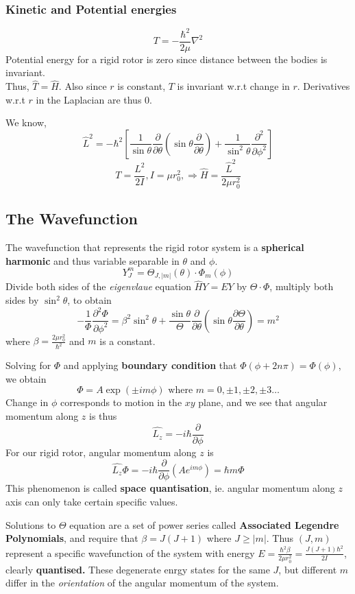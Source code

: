 \documentclass[12pt]{article}
\begin{document}
\subsubsection*{Kinetic and Potential energies}
\[T = -\frac{\hbar^2}{2\mu}\nabla^2\]
Potential energy for a rigid rotor is zero since distance between the bodies is invariant. \\ 
Thus, $\hat{T}=\hat{H}$. Also since $r$ is constant, $T$ is invariant w.r.t change in $r$. Derivatives w.r.t $r$ in the Laplacian are thus $0$.

We know, \[\hat{L}^2=-\hbar^2 \left[ \frac{1}{ \sin\theta} \frac{\partial}{\partial \theta } \left(\sin \theta \frac{\partial}{\partial \theta }\right) +  \frac{1}{\sin^2{\theta}} \frac{\partial^2}{\partial \phi^2 } \right]\]
\[T=\frac{L^2}{2I}, I=\mu r_0^2, \Rightarrow \boxed{\hat{H}= \frac{\hat{L}^2}{2\mu r_0^2 }}\]
\subsection*{The Wavefunction}
The wavefunction that represents the rigid rotor system is a \textbf{spherical harmonic} and thus variable separable in $\theta$ and $\phi$. 
\[Y_J^m=\Theta_{J, |m|}(\theta) \cdot \Phi_m(\phi)\]
Divide both sides of the \emph{eigenvlaue} equation $\hat{H}Y=EY$ by $\Theta \cdot \Phi$, multiply both sides by $\sin^2{\theta}$, to obtain 
\[-\frac{1}{\Phi}\frac{\partial^2 \Phi}{\partial \phi^2} = \beta^2 \sin^2\theta + \frac{\sin \theta}{\Theta} \frac{\partial}{\partial \theta} \left( \sin\theta \frac{\partial \Theta }{\partial \theta}\right) = m^2\]
where $\beta = \displaystyle \frac{2\mu r_0^2}{\hbar^2}$ and $m $ is a constant.

Solving for $\Phi$ and applying \textbf{boundary condition} that $\Phi(\phi + 2n\pi) = \Phi(\phi)$, we obtain
\[\Phi=A \exp{(\pm i m \phi)} \text{ where } m=0, \pm 1, \pm 2, \pm 3 \ldots\]
Change in $\phi$ corresponds to motion in the $xy$ plane, and we see that angular momentum along $z$ is thus \[\hat{L_z}=-i\hbar \frac{\partial}{\partial\phi}\]
For our rigid rotor, angular momentum along $z$ is 
\[\hat{L_z}\Phi=-i\hbar \frac{\partial}{\partial\phi} \left( Ae^{im\phi} \right) = \hbar m \Phi\]
This phenomenon is called \textbf{space quantisation}, ie. angular momentum along $z$ axis can only take certain specific values.

Solutions to $\Theta$ equation are a set of power series called \textbf{Associated Legendre Polynomials}, and require that $\beta= J(J+1)$ where $J \geq |m|$. Thus $(J, m)$ represent a specific wavefunction of the system with energy $\displaystyle E=\frac{\hbar^2 \beta}{2\mu r_0^2}= \frac{J(J+1)\hbar^2}{2I}$, clearly \textbf{quantised.} These degenerate enrgy states for the same $J$, but different $m$ differ in the \emph{orientation} of the angular momentum of the system.
\end{document}
